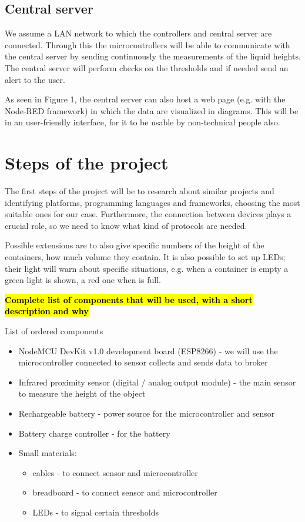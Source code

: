 \documentclass{article}
\begin{document}
\subsection{Central server}

We assume a LAN network to which the controllers and central
server are connected. Through this the microcontrollers will be able to communicate with the
central server by sending continuously the measurements of the liquid heights. 
The central server will perform checks on the thresholds and if needed send an alert to the user. 

As seen in Figure 1, the central server can also host a web page (e.g. with the Node-RED framework) in which the data are visualized in diagrams. 
This will be in an user-friendly interface, for it to be usable by non-technical people also.

\section{Steps of the project}

The first steps of the project will be to research about similar projects and
identifying platforms, programming languages and frameworks, choosing
the most suitable ones for our case.
Furthermore, the connection between devices
plays a crucial role, so we need to know what kind of protocols are needed.

Possible extensions are to also give specific numbers of the height of the
containers, how much volume they contain.
It is also possible to set up LEDs; their light will warn about specific
situations, e.g. when a container is empty a green light is shown, a red one when
is full.

\textcolor{red}{\textbf{\hl{Complete list of components that will be used, with a short description and why}}}

List of ordered components
\begin{itemize}
\item NodeMCU DevKit v1.0 development board (ESP8266) - we will use the microcontroller connected to sensor collects and sends data to broker
\item Infrared proximity sensor (digital / analog output module) - the main sensor to measure the height of the object
\item Rechargeable battery - power source for the microcontroller and sensor
\item Battery charge controller - for the battery
\item Small materials: 
	\begin{itemize}
		\item cables - to connect sensor and microcontroller
		\item breadboard - to connect sensor and microcontroller
		\item LEDs - to signal certain thresholds
	\end{itemize}
\end{itemize}
\end{document}
